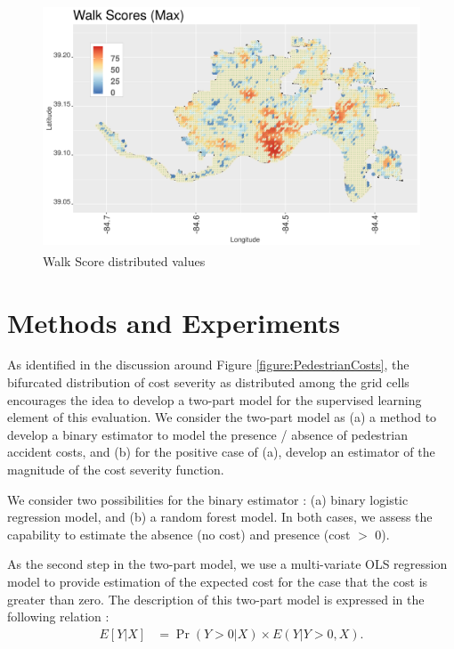 \documentclass{llncs}
\begin{document}
\FloatBarrier
\begin{figure}
 	\includegraphics[width=\textwidth, height=\textheight, keepaspectratio]{walkScore}
 	\caption{Walk Score\textsuperscript{\tiny\textregistered} distributed values}
	\label{figure : walkScore}
\end{figure}
\FloatBarrier

\section{Methods and Experiments}

As identified in the discussion around Figure \ref{figure:PedestrianCosts}, the bifurcated distribution of cost severity as distributed among the grid cells encourages the idea to develop a two-part model for the supervised learning element of this evaluation. We consider the two-part model as (a) a method to develop a binary estimator to model the presence / absence of pedestrian accident costs, and (b) for the positive case of (a), develop an estimator of the magnitude of the cost severity function.

We consider two possibilities for the binary estimator : (a) binary logistic regression model, and (b) a random forest model. In both cases, we assess the capability to estimate the absence (no cost) and presence (cost $>$ 0).

As the second step in the two-part model, we use a multi-variate OLS regression model to provide estimation of the expected cost for the case that the cost is greater than zero. The description of this two-part model is expressed in the following relation : 
% 
\begin{align}
E[Y| X] &= \Pr(Y > 0 | X)\times E(Y | Y > 0,  X).
\end{align}
\end{document}
